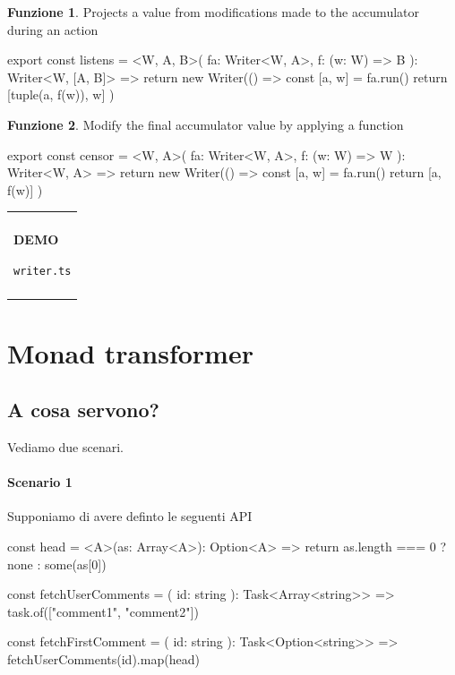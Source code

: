 \documentclass[12pt]{article}
\theoremstyle{definition}
\newtheorem{function}{Funzione}[section]
\newenvironment{demo}
    {\begin{center}
    \begin{tabular}{|p{0.9\textwidth}|}
    \hline\\
    }
    {
    \\\\\hline
    \end{tabular}
    \end{center}
    }
\newenvironment{code}
  {\vspace{0.5cm} \VerbatimEnvironment\begin{typescriptcode}}
  {\end{typescriptcode} \vspace{0.2cm}}
\begin{document}
\begin{function}
Projects a value from modifications made to the accumulator during an action

\begin{code}
export const listens = <W, A, B>(
  fa: Writer<W, A>,
  f: (w: W) => B
): Writer<W, [A, B]> => {
  return new Writer(() => {
    const [a, w] = fa.run()
    return [tuple(a, f(w)), w]
  })
}
\end{code}
\end{function}

\begin{function}
Modify the final accumulator value by applying a function

\begin{code}
export const censor = <W, A>(
  fa: Writer<W, A>,
  f: (w: W) => W
): Writer<W, A> => {
  return new Writer(() => {
    const [a, w] = fa.run()
    return [a, f(w)]
  })
}
\end{code}
\end{function}

\begin{demo}
\begin{center}
\textbf{DEMO}

\texttt{writer.ts}
\end{center}
\end{demo}

\newpage

\section{Monad transformer}

\subsection{A cosa servono?}

Vediamo due scenari.

\paragraph{Scenario 1}

Supponiamo di avere definto le seguenti API

\begin{code}
const head = <A>(as: Array<A>): Option<A> => {
  return as.length === 0 ? none : some(as[0])
}

const fetchUserComments = (
  id: string
): Task<Array<string>> => task.of(["comment1", "comment2"])

const fetchFirstComment = (
  id: string
): Task<Option<string>> => fetchUserComments(id).map(head)
\end{code}
\end{document}
